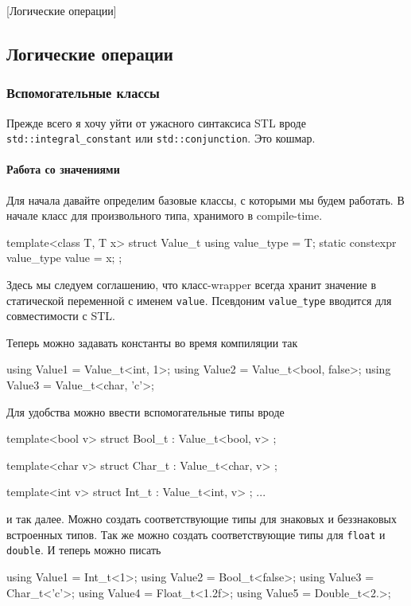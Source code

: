 [Логические операции]


\subsection{Логические операции}

\subsubsection{Вспомогательные классы}

Прежде всего я хочу уйти от ужасного синтаксиса STL вроде \verb"std::integral_constant" или \verb"std::conjunction".
Это кошмар.

\paragraph{Работа со значениями}

Для начала давайте определим базовые классы, с которыми мы будем работать.
В начале класс для произвольного типа, хранимого в compile-time.
\begin{cppcode}
template<class T, T x>
struct Value_t {
  using value_type = T;
  static constexpr value_type value = x;
};
\end{cppcode}
Здесь мы следуем соглашению, что класс-wrapper всегда хранит значение в статической переменной с именем \verb"value".
Псевдоним \verb"value_type" вводится для совместимости с STL.

Теперь можно задавать константы во время компиляции так
\begin{cppcode}
using Value1 = Value_t<int, 1>;
using Value2 = Value_t<bool, false>;
using Value3 = Value_t<char, 'c'>;
\end{cppcode}
Для удобства можно ввести вспомогательные типы вроде
\begin{cppcode}
template<bool v>
struct Bool_t : Value_t<bool, v> {};

template<char v>
struct Char_t : Value_t<char, v> {};

template<int v>
struct Int_t : Value_t<int, v> {};
...
\end{cppcode}
и так далее.
Можно создать соответствующие типы для знаковых и беззнаковых встроенных типов.
Так же можно создать соответствующие типы для \verb"float" и \verb"double".
И теперь можно писать
\begin{cppcode}
using Value1 = Int_t<1>;
using Value2 = Bool_t<false>;
using Value3 = Char_t<'c'>;
using Value4 = Float_t<1.2f>;
using Value5 = Double_t<2.>;
\end{cppcode}


